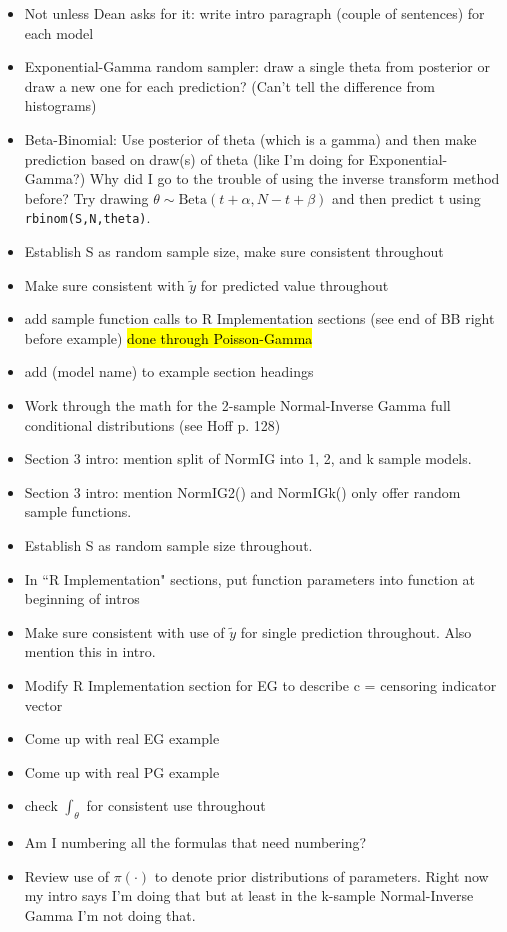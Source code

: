 \documentclass[12pt, a4paper]{article}
\begin{document}
\begin{itemize}
  \item Not unless Dean asks for it:  write intro paragraph (couple of sentences) for each model
  \item Exponential-Gamma random sampler:  draw a single theta from posterior or draw a new one for each prediction?  (Can't tell the difference from histograms)
  \item Beta-Binomial:  Use posterior of theta (which is a gamma) and then make prediction based on draw(s) of theta (like I'm doing for Exponential-Gamma?)  Why did I go to the trouble of using the inverse transform method before?  Try drawing $\theta\sim\text{Beta}(t+\alpha,N-t+\beta)$ and then predict t using \texttt{rbinom(S,N,theta)}.
  \item Establish S as random sample size, make sure consistent throughout
  \item Make sure consistent with $\tilde{y}$ for predicted value throughout
  \item add sample function calls to R Implementation sections (see end of BB right before example) \hl{done through Poisson-Gamma}
  \item add (model name) to example section headings
  \item Work through the math for the 2-sample Normal-Inverse Gamma full conditional distributions (see Hoff p. 128)
  \item Section 3 intro:  mention split of NormIG into 1, 2, and k sample models.
  \item Section 3 intro:  mention NormIG2() and NormIGk() only offer random sample functions.
  \item Establish S as random sample size throughout.
  \item In ``R Implementation" sections, put function parameters into function at beginning of intros
  \item Make sure consistent with use of $\tilde{y}$ for single prediction throughout.  Also mention this in intro.
  \item Modify R Implementation section for EG to describe c = censoring indicator vector
  \item Come up with real EG example
  \item Come up with real PG example
  \item check $\int_\theta$ for consistent use throughout
  \item Am I numbering all the formulas that need numbering?
  \item Review use of $\pi(\cdot)$ to denote prior distributions of parameters.  Right now my intro says I'm doing that but at least in the k-sample Normal-Inverse Gamma I'm not doing that.

\end{itemize}
\end{document}

